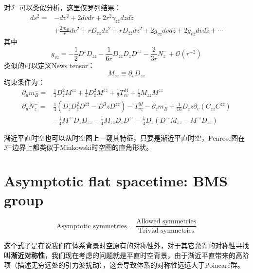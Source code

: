 对$\mathcal{I}^{-}$可以类似分析，这里仅罗列结果：
\begin{equation}
	\begin{aligned}
		ds^2=&-dv^2+2dvdr+2r^2\gamma_{z\bar z}dzd{\bar z}\\
		&+\frac{2m^-_B}{r}dv^2+rD_{zz}dz^2+rD_{\bar z\bar z}d{\bar z}^2+2g_{vz}dvdz+2g_{v\bar z}dvd\bar z+\cdots
	\end{aligned}
\end{equation}
其中
\begin{equation}
	g_{vz}=-\frac{1}{2}D^zD_{zz}-\frac{1}{6r}D_{zz}D_zD^{zz}-\frac{2}{3r}N^-_z+\mathcal{O}(r^{-2})
\end{equation}
类似的可以定义News tensor：
\begin{equation}
	M_{zz}\equiv \partial_v D_{zz}
\end{equation}
约束条件为：
\begin{equation}
	\begin{aligned}
		\partial_u m^-_B=&\frac{1}{4}D_z^2M^{zz}+\frac{1}{4}D_{\bar z}^2M^{\bar z\bar z}+\frac{1}{2}T^M_{vv}+\frac{1}{4}M_{zz}M^{zz}\\
		\partial_u N^-_z=&\frac{1}{4}\left(D_zD_{\bar z}^2D^{\bar z\bar z}-D^3zD^{zz}\right)-T^{M}_{vz}-\partial_z m^-_B+\frac{1}{16}D_zz\partial_v(C_{zz}C^{zz})\\
		&-\frac{1}{4}M^{zz}D_zD_{zz}-\frac{1}{4}M_{zz}D_zD^{zz}-\frac{1}{4}D_z\left(D^{zz}M_{zz}-M^{zz}D_{zz}\right)
	\end{aligned}
\end{equation}

渐近平直时空也可以从时空图上一窥其特征\cite{zhaoliu}，只要是渐近平直时空，Penrose图在$\mathcal{I}^\pm$边界上都类似于Minkowski时空图的直角形状。

\section{Asymptotic flat spacetime: BMS group}
\begin{equation}
	\text{Asymptotic symmetries}=\frac{\text{Allowed symmetries}}{\text{Trivial symmetries}}
\end{equation}

这个式子是在说我们在体系背景时空原有的对称性外，对于其它允许的对称性寻找叫\textbf{渐近对称性}，我们现在考虑的问题就是平直时空背景，由于渐近平直带来的高阶项（描述无穷远处的引力波扰动），这会导致体系的对称性远远大于Poincar\'e群。

